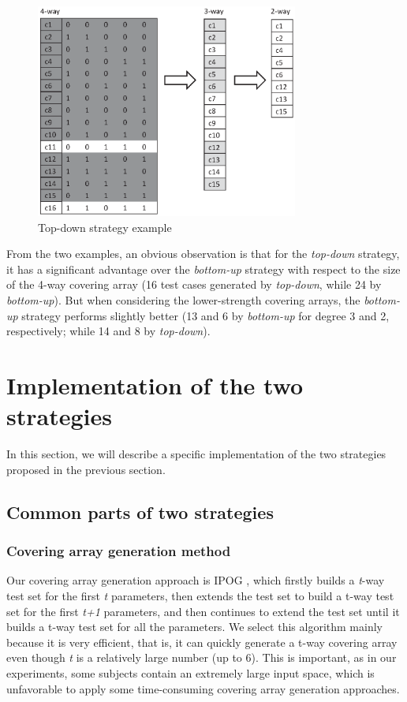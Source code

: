 \documentclass[conference]{IEEEtran}
\theoremstyle{definition}
\begin{document}
\begin{figure}
 \includegraphics[width=3.4in]{decrease_example.eps}
\caption{Top-down strategy example}
\label{decrease-example}
\end{figure}


From the two examples, an obvious observation is that for the \emph{top-down} strategy, it has a significant advantage over the \emph{bottom-up} strategy with respect to the size of the 4-way covering array (16 test cases generated by \emph{top-down}, while 24 by \emph{bottom-up}). But when considering the lower-strength covering arrays, the \emph{bottom-up} strategy performs slightly better (13 and 6 by \emph{bottom-up} for degree 3 and 2, respectively; while 14 and 8 by \emph{top-down}).




\section{Implementation of the two strategies}
In this section, we will describe a specific implementation of the two strategies proposed in the previous section.

\subsection{Common parts of two strategies}

\subsubsection{Covering array generation method}
Our covering array generation approach is IPOG \cite{lei2007ipog,lei2008ipog,yu2013efficient}, which firstly builds a \emph{t}-way test set for the first \emph{t} parameters, then extends the test set to build a t-way test set for the first \emph{t+1} parameters, and then continues to extend the test set until it builds a t-way test set for all the parameters. We select this algorithm mainly because it is very efficient, that is, it can quickly generate a t-way covering array even though \emph{t} is a relatively large number (up to 6). This is important, as in our experiments, some subjects contain an extremely large input space, which is unfavorable to apply some time-consuming covering array generation approaches.
\end{document}
